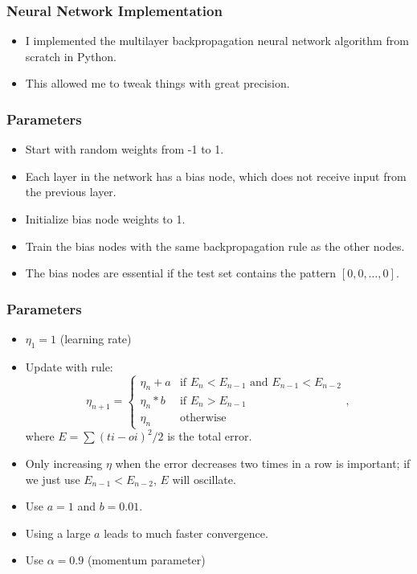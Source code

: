 \documentclass{beamer}
\numberwithin{equation}{section} %
\begin{document}
\begin{frame}
    \frametitle{Neural Network Implementation}
    \begin{itemize}
        \item I implemented the multilayer backpropagation neural network algorithm from scratch in Python.
        \pause
        \item This allowed me to tweak things with great precision.
    \end{itemize}
\end{frame}

\begin{frame}
    \frametitle{Parameters}
    \begin{itemize}
        \item Start with random weights from -1 to 1.
        \pause
        \item Each layer in the network has a bias node, which does not receive input from the previous layer.
        \pause
        \item Initialize bias node weights to 1.
        \pause
        \item Train the bias nodes with the same backpropagation rule as the other nodes.
        \pause
        \item The bias nodes are essential if the test set contains the pattern $[0, 0, \ldots, 0]$.
    \end{itemize}
\end{frame}

\begin{frame}
    \frametitle{Parameters}
    \begin{itemize}
        \item $\eta_1 = 1$ (learning rate)
        \pause
        \item Update with rule:
        \begin{equation}
            \eta_{n+1} =
            \begin{cases}
               \eta_n + a & \text{if } E_n < E_{n - 1} \text{ and } E_{n - 1} < E_{n - 2} \\
               \eta_n*b & \text{if }E_n > E_{n - 1} \\
               \eta_n & \text{otherwise}
          \end{cases},
        \end{equation}
        where $E=\sum{(ti - oi)^2}/2$ is the total error.
        \pause
        \item Only increasing $\eta$ when the error decreases two times in a row is important; if we just use $E_{n - 1} < E_{n - 2}$, $E$ will oscillate.
        \pause
        \item Use $a=1$ and $b=0.01$.
        \pause
        \item Using a large $a$ leads to much faster convergence.
        \pause
        \item Use $\alpha = 0.9$ (momentum parameter)
    \end{itemize}
\end{frame}
\end{document}
